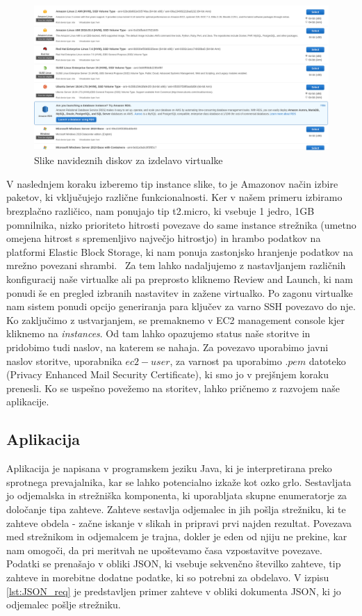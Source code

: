 \begin{figure}[H]
    \centering
    \includegraphics[scale=0.25]{Img/1_AWS_images.png}
    \caption{Slike navideznih diskov za izdelavo virtualke}
    \label{fig:1_AWS_images}
\end{figure}

V naslednjem koraku izberemo tip instance slike, to je Amazonov način izbire paketov, ki vključujejo različne funkcionalnosti. Ker v našem primeru izbiramo brezplačno različico, nam ponujajo tip t2.micro, ki vsebuje 1 jedro, 1GB pomnilnika, nizko prioriteto hitrosti povezave do same instance strežnika (umetno omejena hitrost s spremenljivo največjo hitrostjo) in hrambo podatkov na platformi Elastic Block Storage, ki nam ponuja zastonjsko hranjenje podatkov na mrežno povezani shrambi.~\cite{1_aws_amazon_ebs} Za tem lahko nadaljujemo z nastavljanjem različnih konfiguracij naše virtualke ali pa preprosto kliknemo Review and Launch, ki nam ponudi še en pregled izbranih nastavitev in zažene virtualko. Po zagonu virtualke nam sistem ponudi opcijo generiranja para ključev za varno SSH povezavo do nje. Ko zaključimo z ustvarjanjem, se premaknemo v EC2 management console kjer kliknemo na \emph{instances}. Od tam lahko opazujemo status naše storitve in pridobimo tudi naslov, na katerem se nahaja. Za povezavo uporabimo javni naslov storitve, uporabnika $ec2-user$, za varnost pa uporabimo $.pem$ datoteko (Privacy Enhanced Mail Security Certificate), ki smo jo v prejšnjem koraku prenesli. Ko se uspešno povežemo na storitev, lahko pričnemo z razvojem naše aplikacije.

\subsection{Aplikacija}

Aplikacija je napisana v programskem jeziku Java, ki je interpretirana preko sprotnega prevajalnika, kar se lahko potencialno izkaže kot ozko grlo. Sestavljata jo odjemalska in strežniška komponenta, ki uporabljata skupne enumeratorje za določanje tipa zahteve. Zahteve sestavlja odjemalec in jih pošlja strežniku, ki te zahteve obdela - začne iskanje v slikah in pripravi prvi najden rezultat. Povezava med strežnikom in odjemalcem je trajna, dokler je eden od njiju ne prekine, kar nam omogoči, da pri meritvah ne upoštevamo časa vzpostavitve povezave. Podatki se prenašajo v obliki JSON, ki vsebuje sekvenčno številko zahteve, tip zahteve in morebitne dodatne podatke, ki so potrebni za obdelavo. V izpisu \ref{lst:JSON_req} je predstavljen primer zahteve v obliki dokumenta JSON, ki jo odjemalec pošlje strežniku.

